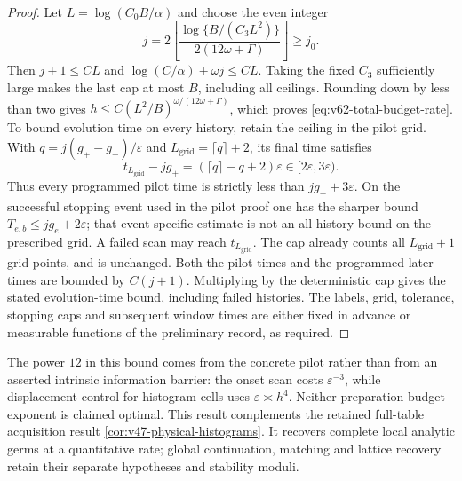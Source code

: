 \begin{proof}
Let $L=\log(C_0B/\alpha)$ and choose the even integer
\[
 j=2\left\lfloor
       \frac{\log\{B/(C_3L^2)\}}{2(12\omega+\Gamma)}
       \right\rfloor\ge j_0.
\]
Then $j+1\le CL$ and $\log(C/\alpha)+\omega j\le CL$.
Taking the fixed $C_3$ sufficiently large makes the last cap at most
$B$, including all ceilings.  Rounding down by less than two gives
$h\le C(L^2/B)^{\omega/(12\omega+\Gamma)}$, which proves
\eqref{eq:v62-total-budget-rate}.  To bound evolution time on every
history, retain the ceiling in the pilot grid.  With
$q=j(g_+-g_-)/\varepsilon$ and $L_{\mathrm{grid}}=\lceil q\rceil+2$, its final time satisfies
\begin{equation}\label{eq:v63-pilot-time}
 t_{L_{\mathrm{grid}}}-jg_+=(\lceil q\rceil-q+2)\varepsilon
                    \in[2\varepsilon,3\varepsilon).
\end{equation}
Thus every programmed pilot time is strictly less than
$jg_++3\varepsilon$.  On the successful stopping event used in the pilot
proof one has the sharper bound $T_{e,b}\le jg_e+2\varepsilon$; that
event-specific estimate is not an all-history bound on the prescribed
grid.  A failed scan may reach $t_{L_{\mathrm{grid}}}$.  The cap already counts all $L_{\mathrm{grid}}+1$
grid points, and is unchanged.  Both the pilot times and the programmed
later times are bounded by $C(j+1)$.  Multiplying by the deterministic
cap gives the stated evolution-time bound, including failed histories.  The labels, grid, tolerance, stopping caps and
subsequent window times are either fixed in advance or measurable
functions of the preliminary record, as required.
\end{proof}

The power $12$ in this bound comes from the concrete pilot rather than
from an asserted intrinsic information barrier: the onset scan costs
$\varepsilon^{-3}$, while displacement control for histogram cells uses
$\varepsilon\asymp h^4$.  Neither preparation-budget exponent is claimed
optimal.  This result complements the retained full-table acquisition
result \ref{cor:v47-physical-histograms}.  It recovers complete local
analytic germs at a quantitative rate; global continuation, matching and
lattice recovery retain their separate hypotheses and stability moduli.
